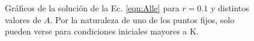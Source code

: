 \documentclass[twocolumn,aps,prl]{revtex4-1}
\begin{document}
\begin{figure}[ht!]
\begin{subfigure}[b]{0.495\linewidth}
        \caption{}
        \label{fig:scripts/plots/ex6-y0grande02}
    \end{subfigure}
    \caption{Gráficos de la solución de la Ec. \ref{eqn:Alle} para $r=0.1$ y distintos valores de $A$. Por la naturaleza de uno de los puntos fijos, solo pueden verse para condiciones iniciales mayores a K.}
\end{figure}


\end{document}

